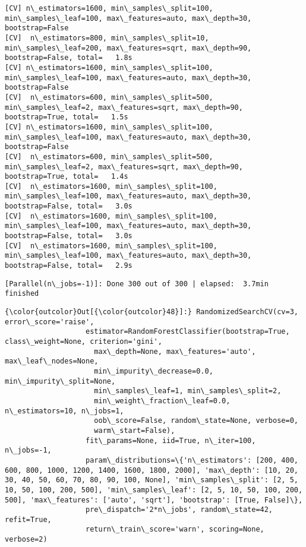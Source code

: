 \documentclass[11pt]{article}
\begin{document}
\begin{Verbatim}[commandchars=\\\{\}]
[CV] n\_estimators=1600, min\_samples\_split=100, min\_samples\_leaf=100, max\_features=auto, max\_depth=30, bootstrap=False 
[CV]  n\_estimators=800, min\_samples\_split=10, min\_samples\_leaf=200, max\_features=sqrt, max\_depth=90, bootstrap=False, total=   1.8s
[CV] n\_estimators=1600, min\_samples\_split=100, min\_samples\_leaf=100, max\_features=auto, max\_depth=30, bootstrap=False 
[CV]  n\_estimators=600, min\_samples\_split=500, min\_samples\_leaf=2, max\_features=sqrt, max\_depth=90, bootstrap=True, total=   1.5s
[CV] n\_estimators=1600, min\_samples\_split=100, min\_samples\_leaf=100, max\_features=auto, max\_depth=30, bootstrap=False 
[CV]  n\_estimators=600, min\_samples\_split=500, min\_samples\_leaf=2, max\_features=sqrt, max\_depth=90, bootstrap=True, total=   1.4s
[CV]  n\_estimators=1600, min\_samples\_split=100, min\_samples\_leaf=100, max\_features=auto, max\_depth=30, bootstrap=False, total=   3.0s
[CV]  n\_estimators=1600, min\_samples\_split=100, min\_samples\_leaf=100, max\_features=auto, max\_depth=30, bootstrap=False, total=   3.0s
[CV]  n\_estimators=1600, min\_samples\_split=100, min\_samples\_leaf=100, max\_features=auto, max\_depth=30, bootstrap=False, total=   2.9s

    \end{Verbatim}

    \begin{Verbatim}[commandchars=\\\{\}]
[Parallel(n\_jobs=-1)]: Done 300 out of 300 | elapsed:  3.7min finished

    \end{Verbatim}

\begin{Verbatim}[commandchars=\\\{\}]
{\color{outcolor}Out[{\color{outcolor}48}]:} RandomizedSearchCV(cv=3, error\_score='raise',
                   estimator=RandomForestClassifier(bootstrap=True, class\_weight=None, criterion='gini',
                     max\_depth=None, max\_features='auto', max\_leaf\_nodes=None,
                     min\_impurity\_decrease=0.0, min\_impurity\_split=None,
                     min\_samples\_leaf=1, min\_samples\_split=2,
                     min\_weight\_fraction\_leaf=0.0, n\_estimators=10, n\_jobs=1,
                     oob\_score=False, random\_state=None, verbose=0,
                     warm\_start=False),
                   fit\_params=None, iid=True, n\_iter=100, n\_jobs=-1,
                   param\_distributions=\{'n\_estimators': [200, 400, 600, 800, 1000, 1200, 1400, 1600, 1800, 2000], 'max\_depth': [10, 20, 30, 40, 50, 60, 70, 80, 90, 100, None], 'min\_samples\_split': [2, 5, 10, 50, 100, 200, 500], 'min\_samples\_leaf': [2, 5, 10, 50, 100, 200, 500], 'max\_features': ['auto', 'sqrt'], 'bootstrap': [True, False]\},
                   pre\_dispatch='2*n\_jobs', random\_state=42, refit=True,
                   return\_train\_score='warn', scoring=None, verbose=2)
\end{Verbatim}
            
\end{document}
